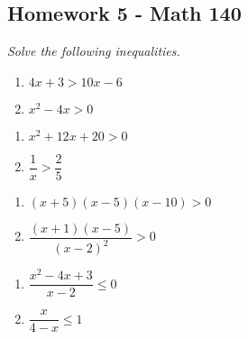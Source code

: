 \documentclass[10pt]{article}
\newcommand{\ds}{\displaystyle}
\begin{document}
\pagestyle{empty}
\subsection*{Homework 5 - Math 140}

\noindent
\textit{Solve the following inequalities. } 


\begin{multicols}{2}
\begin{enumerate}
\item $4x+3 > 10x-6$
\item $x^2 - 4x > 0$ 
\setcounter{enumCount}{\theenumi}
\end{enumerate}
\end{multicols}
\vfill

\begin{multicols}{2}
\begin{enumerate}
\setcounter{enumi}{\theenumCount}
\item $x^2 + 12x + 20 > 0$
\item $\dfrac{1}{x} > \dfrac{2}{5}$
\setcounter{enumCount}{\theenumi}
\end{enumerate}
\end{multicols}
\vfill

\begin{multicols}{2}
\begin{enumerate}
\setcounter{enumi}{\theenumCount}
\item $(x+5)(x-5)(x-10) > 0$ 
\item $\dfrac{(x+1)(x-5)}{(x-2)^2} > 0$
\setcounter{enumCount}{\theenumi}
\end{enumerate}
\end{multicols}
\vfill


\begin{multicols}{2}
\begin{enumerate}
\setcounter{enumi}{\theenumCount}
\item $\dfrac{x^2-4x+3}{x-2} \le 0$
\item $\dfrac{x}{4-x} \le 1$ 
\setcounter{enumCount}{\theenumi}
\end{enumerate}
\end{multicols}
\vfill
\end{document}
